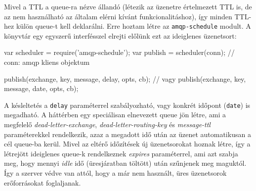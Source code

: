 Mivel a TTL a queue-ra nézve állandó (létezik az üzenetre értelmezett TTL is,
de az nem használható az általam elérni kívánt funkcionalitáshoz), így
minden TTL-hez külön queue-t kell deklarálni.
Erre hoztam létre az \verb=amqp-schedule= modult. A könyvtár egy egyszerű
interfésszel elrejti előlünk ezt az ideiglenes üzenetsort:

\begin{js}
  var scheduler = require('amqp-schedule');
  var publish = scheduler(conn); // conn: amqp kliens objektum

  publish(exchange, key, message, delay, opts, cb);
  // vagy
  publish(exchange, key, message, date, opts, cb);
\end{js}

A késleltetés a \verb=delay= paraméterrel szabályozható, vagy konkrét időpont
(\verb=date=) is megadható. A háttérben egy speciálisan elnevezett
queue jön létre, ami a megfelelő \emph{dead-letter-exchange},
\emph{dead-letter-routing-key} és \emph{message-ttl} paraméterekkel rendelkezik,
azaz a megadott idő után az üzenet automatikusan a cél queue-ba kerül.
Mivel az eltérő időzítések új üzenetsorokat hoznak létre, így
a létrejött ideiglenes queue-k rendelkeznek \emph{expires} paraméterrel,
ami azt szabja meg, hogy mennyi \emph{idle} idő (üresjáratban töltött)
után szűnjenek meg maguktól. Így a szerver védve van attól, hogy a már nem
használt, üres üzenetsorok erőforrásokat foglaljanak.
